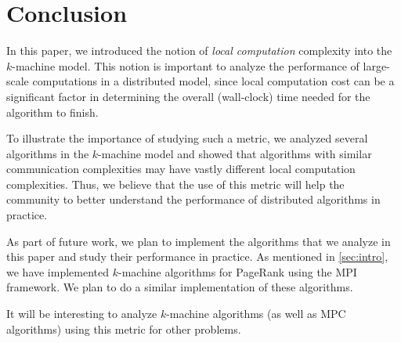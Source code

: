 \section{Conclusion}
\label{sec:conclusion}
In this paper, we introduced the notion of \textit{local computation} complexity into the $k$-machine model. This notion is important to analyze the performance of large-scale computations in a distributed model, since local computation cost can be a significant factor
in determining the overall (wall-clock) time needed for the algorithm to finish. 

To illustrate the importance of studying such a metric, we analyzed several algorithms in the $k$-machine model and showed that algorithms with similar communication complexities may have vastly different local computation complexities. Thus, we believe that the use of this metric will help the community to better understand the performance of distributed algorithms in practice. 

As part of future work, we plan to implement the algorithms that we analyze in this paper and study their performance in practice. As mentioned in \cref{sec:intro}, we have implemented $k$-machine algorithms for PageRank using the MPI framework.
We plan to do a similar implementation of these algorithms.

It will be interesting to  analyze $k$-machine algorithms (as well as MPC algorithms) using this metric
for other problems.